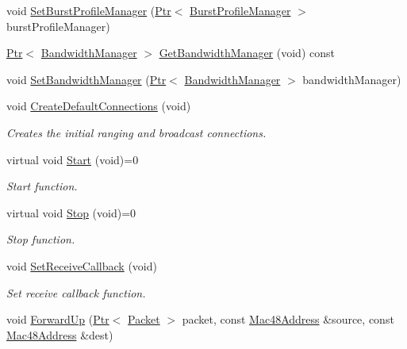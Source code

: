 \begin{DoxyCompactItemize}
\item 
void \hyperlink{classns3_1_1WimaxNetDevice_a67cfa6569ece6ba94e169ad0c3eb8616}{Set\+Burst\+Profile\+Manager} (\hyperlink{classns3_1_1Ptr}{Ptr}$<$ \hyperlink{classns3_1_1BurstProfileManager}{Burst\+Profile\+Manager} $>$ burst\+Profile\+Manager)
\item 
\hyperlink{classns3_1_1Ptr}{Ptr}$<$ \hyperlink{classns3_1_1BandwidthManager}{Bandwidth\+Manager} $>$ \hyperlink{classns3_1_1WimaxNetDevice_ae5b92eaa51e409609c2ac362894af454}{Get\+Bandwidth\+Manager} (void) const 
\item 
void \hyperlink{classns3_1_1WimaxNetDevice_a7c96f4dc3cd90594153978d4f917f50e}{Set\+Bandwidth\+Manager} (\hyperlink{classns3_1_1Ptr}{Ptr}$<$ \hyperlink{classns3_1_1BandwidthManager}{Bandwidth\+Manager} $>$ bandwidth\+Manager)
\item 
void \hyperlink{classns3_1_1WimaxNetDevice_a34ec7e79ca4bcf06098b1e4902be769a}{Create\+Default\+Connections} (void)
\begin{DoxyCompactList}\small\item\em Creates the initial ranging and broadcast connections. \end{DoxyCompactList}\item 
virtual void \hyperlink{classns3_1_1WimaxNetDevice_a3187f9baf365ff4416e86c1efd5f30d9}{Start} (void)=0
\begin{DoxyCompactList}\small\item\em Start function. \end{DoxyCompactList}\item 
virtual void \hyperlink{classns3_1_1WimaxNetDevice_a443e4444e9e13ddd4cef5a7093082d60}{Stop} (void)=0
\begin{DoxyCompactList}\small\item\em Stop function. \end{DoxyCompactList}\item 
void \hyperlink{classns3_1_1WimaxNetDevice_a624c50c1dcaf0030340f323cd582ff9f}{Set\+Receive\+Callback} (void)
\begin{DoxyCompactList}\small\item\em Set receive callback function. \end{DoxyCompactList}\item 
void \hyperlink{classns3_1_1WimaxNetDevice_ae6d708e65981c36d43f075527b11eb8d}{Forward\+Up} (\hyperlink{classns3_1_1Ptr}{Ptr}$<$ \hyperlink{classns3_1_1Packet}{Packet} $>$ packet, const \hyperlink{classns3_1_1Mac48Address}{Mac48\+Address} \&source, const \hyperlink{classns3_1_1Mac48Address}{Mac48\+Address} \&dest)

\end{DoxyCompactItemize}
